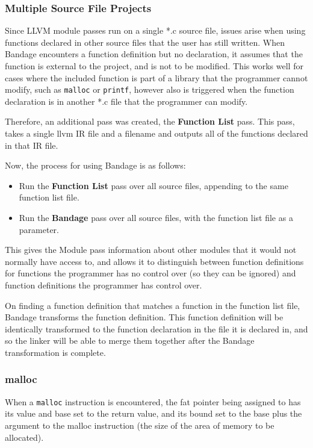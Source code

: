 \subsubsection{Multiple Source File Projects}

Since LLVM module passes run on a single *.c source file, issues arise when using functions declared in other source files that the user has still written.
When Bandage encounters a function definition but no declaration, it assumes that the function is external to the project, and is not to be modified.
This works well for cases where the included function is part of a library that the programmer cannot modify, such as \verb!malloc! or \verb!printf!, however also is triggered when the function declaration is in another *.c file that the programmer can modify.

Therefore, an additional pass was created, the \textbf{Function List} pass.
This pass, takes a single llvm IR file and a filename and outputs all of the functions declared in that IR file.

Now, the process for using Bandage is as follows:
\begin{itemize}
\item Run the \textbf{Function List} pass over all source files, appending to the same function list file.
\item Run the \textbf{Bandage} pass over all source files, with the function list file as a parameter.
\end{itemize}

This gives the Module pass information about other modules that it would not normally have access to, and allows it to distinguish between function definitions for functions the programmer has no control over (so they can be ignored) and function definitions the programmer has control over.

On finding a function definition that matches a function in the function list file, Bandage transforms the function definition.
This function definition will be identically transformed to the function declaration in the file it is declared in, and so the linker will be able to merge them together after the Bandage transformation is complete.

\subsubsection{malloc}

When a \verb!malloc! instruction is encountered, the fat pointer being assigned to has its value and base set to the return value, and its bound set to the base plus the argument to the malloc instruction (the size of the area of memory to be allocated).

